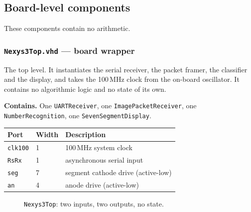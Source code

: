 \documentclass[11pt,a4paper]{article}
\begin{document}
\subsection{Board-level components}
\label{sec:board}

These components contain no arithmetic.

\subsubsection{\texttt{Nexys3Top.vhd} --- board wrapper}
\label{sub:nexys3top}

The top level. It instantiates the serial receiver, the packet framer, the
classifier and the display, and takes the 100\,MHz clock from the on-board
oscillator. It contains no algorithmic logic and no state of its own.

\textbf{Contains.} One \texttt{UARTReceiver}, one \texttt{ImagePacketReceiver},
one \texttt{NumberRecognition}, one \texttt{SevenSegmentDisplay}.

\begin{center}
\small
\begin{tabularx}{\linewidth}{@{}llL@{}}
\toprule
\textbf{Port} & \textbf{Width} & \textbf{Description} \\
\midrule
\texttt{clk100}  & 1  & 100\,MHz system clock \\
\texttt{RsRx}    & 1  & asynchronous serial input \\
\texttt{seg}     & 7  & segment cathode drive (active-low) \\
\texttt{an}      & 4  & anode drive (active-low) \\
\bottomrule
\end{tabularx}
\end{center}

\begin{figure}[H]
\centering
{}
\caption{\texttt{Nexys3Top}: two inputs, two outputs, no state.}
\label{fig:nexys3top}
\end{figure}
\end{document}
